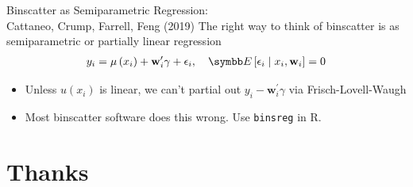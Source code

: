 \documentclass[aspectratio=169,11pt]{beamer}
\begin{document}
\begin{frame}{Binscatter as Semiparametric Regression:\\
\small Cattaneo, Crump, Farrell, Feng (2019)}
The right way to think of binscatter is as \alert{semiparametric} or \alert{partially linear} regression
\begin{align*}
y_{i}=\mu\left(x_{i}\right)+\mathbf{w}_{i}^{\prime} \gamma+\epsilon_{i}, \quad \E\left[\epsilon_{i} \mid x_{i}, \mathbf{w}_{i}\right]=0
\end{align*}
\begin{itemize}
\item Unless $u(x_i)$ is linear, we can't partial out $y_i -\mathbf{w}_{i}^{\prime} \gamma$ via Frisch-Lovell-Waugh
\item Most binscatter software does this wrong. Use \texttt{binsreg} in R.
\end{itemize}
\end{frame}

\section{Thanks}
\end{document}
